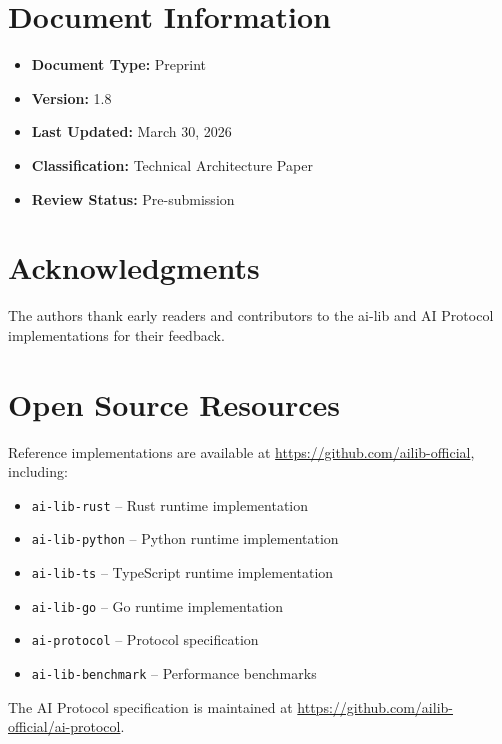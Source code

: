 
\section*{Document Information}
\begin{itemize}
    \item \textbf{Document Type:} Preprint
    \item \textbf{Version:} 1.8
    \item \textbf{Last Updated:} March 30, 2026
    \item \textbf{Classification:} Technical Architecture Paper
    \item \textbf{Review Status:} Pre-submission
\end{itemize}

\section*{Acknowledgments}
The authors thank early readers and contributors to the ai-lib and AI Protocol implementations for their feedback.

\section*{Open Source Resources}
Reference implementations are available at \url{https://github.com/ailib-official}, including:
\begin{itemize}
    \item \texttt{ai-lib-rust} -- Rust runtime implementation
    \item \texttt{ai-lib-python} -- Python runtime implementation
    \item \texttt{ai-lib-ts} -- TypeScript runtime implementation
    \item \texttt{ai-lib-go} -- Go runtime implementation
    \item \texttt{ai-protocol} -- Protocol specification
    \item \texttt{ai-lib-benchmark} -- Performance benchmarks
\end{itemize}

The AI Protocol specification is maintained at \url{https://github.com/ailib-official/ai-protocol}.
